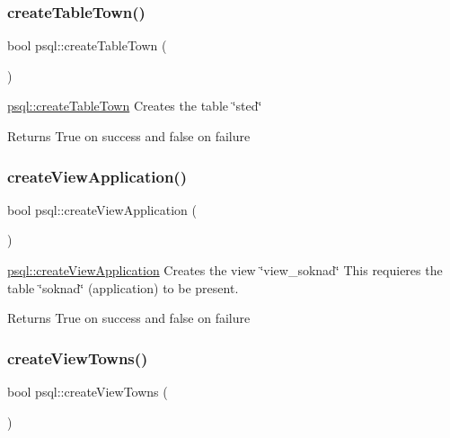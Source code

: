 \subsubsection{\texorpdfstring{create\+Table\+Town()}{createTableTown()}}
{\footnotesize\ttfamily bool psql\+::create\+Table\+Town (\begin{DoxyParamCaption}{ }\end{DoxyParamCaption})}



\mbox{\hyperlink{classpsql_a95d1f522766174bd2c6a7b94f725719c}{psql\+::create\+Table\+Town}} Creates the table \char`\"{}sted\char`\"{} 

\begin{DoxyReturn}{Returns}
True on success and false on failure 
\end{DoxyReturn}
\mbox{\label{classpsql_ad6fb8e1e7177c7996f297d477ecceb27}} 
\subsubsection{\texorpdfstring{create\+View\+Application()}{createViewApplication()}}
{\footnotesize\ttfamily bool psql\+::create\+View\+Application (\begin{DoxyParamCaption}{ }\end{DoxyParamCaption})}



\mbox{\hyperlink{classpsql_ad6fb8e1e7177c7996f297d477ecceb27}{psql\+::create\+View\+Application}} Creates the view \char`\"{}view\+\_\+soknad\char`\"{} This requieres the table \char`\"{}soknad\char`\"{} (application) to be present. 

\begin{DoxyReturn}{Returns}
True on success and false on failure 
\end{DoxyReturn}
\mbox{\label{classpsql_ac5b1230ac405a600b67b144060b33a0d}} 
\subsubsection{\texorpdfstring{create\+View\+Towns()}{createViewTowns()}}
{\footnotesize\ttfamily bool psql\+::create\+View\+Towns (\begin{DoxyParamCaption}{ }\end{DoxyParamCaption})}




